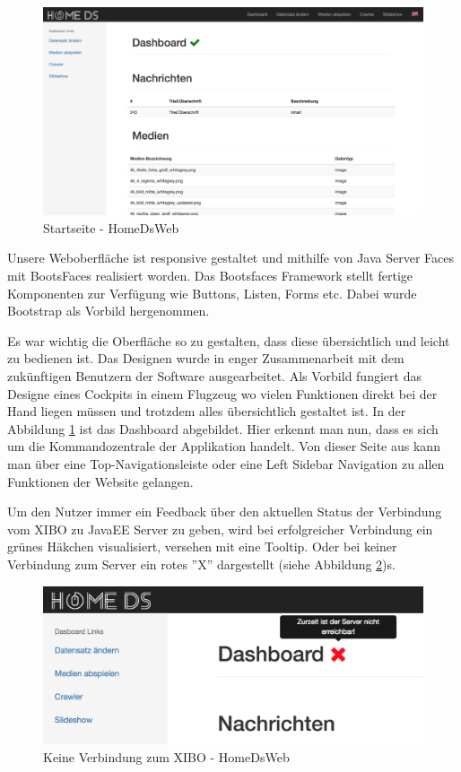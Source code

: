 \begin{figure}[H]
\centering
\includegraphics[width=1\textwidth]{images/08_HomeDsWeb/DashboardHomeDsWeb.png}
\caption{Startseite - HomeDsWeb}
\label{img:Startseite}
\end{figure}

Unsere Weboberfläche ist responsive gestaltet und mithilfe von Java Server Faces mit BootsFaces realisiert worden. Das Bootsfaces Framework stellt fertige Komponenten zur Verfügung wie Buttons, Listen, Forms etc. Dabei wurde Bootstrap als Vorbild hergenommen.

Es war wichtig die Oberfläche so zu gestalten, dass diese übersichtlich und leicht zu bedienen ist. Das Designen wurde in enger Zusammenarbeit mit dem zukünftigen Benutzern der Software ausgearbeitet. Als Vorbild fungiert das Designe eines Cockpits in einem Flugzeug wo vielen Funktionen direkt bei der Hand liegen müssen und trotzdem alles übersichtlich gestaltet ist. In der Abbildung \ref{img:Startseite} ist das Dashboard abgebildet. 
Hier erkennt man nun, dass es sich um die Kommandozentrale der Applikation handelt. Von dieser Seite aus kann man über eine Top-Navigationsleiste oder eine Left Sidebar Navigation zu allen Funktionen der Website gelangen. 

Um den Nutzer immer ein Feedback über den aktuellen Status der Verbindung vom XIBO zu JavaEE Server zu geben, wird bei erfolgreicher Verbindung ein grünes Häkchen visualisiert, versehen mit eine Tooltip. Oder bei keiner Verbindung zum Server ein rotes ''X'' dargestellt (siehe Abbildung  \ref{img:NoConnection})s.

\begin{figure}[H]
\includegraphics[width=1\textwidth]{images/08_HomeDsWeb/DashboardNoConnection.png}
\caption{Keine Verbindung zum XIBO - HomeDsWeb}
\label{img:NoConnection}
\end{figure}

